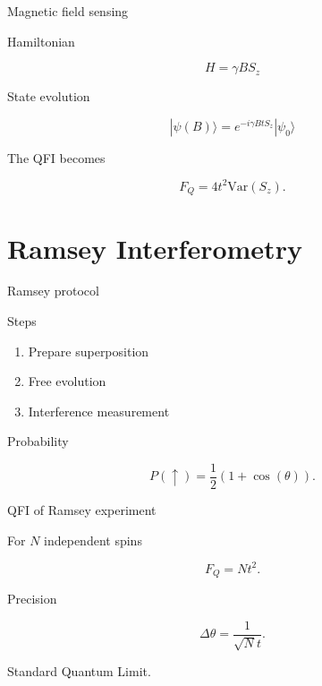 \documentclass[aspectratio=169]{beamer}
\begin{document}
\begin{frame}{Magnetic field sensing}

Hamiltonian

\begin{equation}
H = \gamma B S_z
\end{equation}

State evolution

\begin{equation}
|\psi(B)\rangle = e^{-i \gamma B t S_z} |\psi_0\rangle
\end{equation}

The QFI becomes

\begin{equation}
F_Q = 4 t^2 \mathrm{Var}(S_z).
\end{equation}
\end{frame}

\section{Ramsey Interferometry}

\begin{frame}{Ramsey protocol}

Steps

\begin{enumerate}
\item Prepare superposition
\item Free evolution
\item Interference measurement
\end{enumerate}

Probability

\begin{equation}
P(\uparrow) = \frac12 (1+\cos(\theta)).
\end{equation}
\end{frame}

\begin{frame}{QFI of Ramsey experiment}

For $N$ independent spins

\begin{equation}
F_Q = N t^2.
\end{equation}

Precision

\begin{equation}
\Delta \theta = \frac{1}{\sqrt{N} t}.
\end{equation}

Standard Quantum Limit.
\end{frame}
\end{document}
